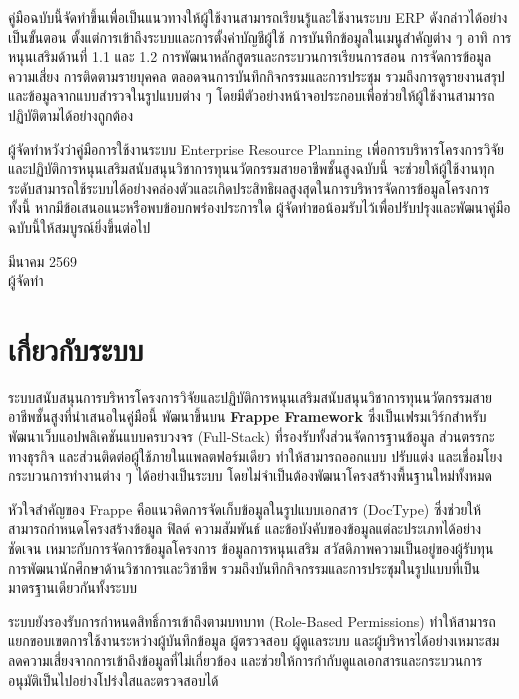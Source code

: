 \documentclass[17pt,a4paper]{extarticle}
\begin{document}
คู่มือฉบับนี้จัดทำขึ้นเพื่อเป็นแนวทางให้ผู้ใช้งานสามารถเรียนรู้และใช้งานระบบ ERP ดังกล่าวได้อย่างเป็นขั้นตอน ตั้งแต่การเข้าถึงระบบและการตั้งค่าบัญชีผู้ใช้ การบันทึกข้อมูลในเมนูสำคัญต่าง ๆ อาทิ การหนุนเสริมด้านที่ 1.1 และ 1.2 การพัฒนาหลักสูตรและกระบวนการเรียนการสอน การจัดการข้อมูลความเสี่ยง การติดตามรายบุคคล ตลอดจนการบันทึกกิจกรรมและการประชุม รวมถึงการดูรายงานสรุปและข้อมูลจากแบบสำรวจในรูปแบบต่าง ๆ โดยมีตัวอย่างหน้าจอประกอบเพื่อช่วยให้ผู้ใช้งานสามารถปฏิบัติตามได้อย่างถูกต้อง

ผู้จัดทำหวังว่าคู่มือการใช้งานระบบ Enterprise Resource Planning เพื่อการบริหารโครงการวิจัยและปฏิบัติการหนุนเสริมสนับสนุนวิชาการทุนนวัตกรรมสายอาชีพชั้นสูงฉบับนี้ จะช่วยให้ผู้ใช้งานทุกระดับสามารถใช้ระบบได้อย่างคล่องตัวและเกิดประสิทธิผลสูงสุดในการบริหารจัดการข้อมูลโครงการ ทั้งนี้ หากมีข้อเสนอแนะหรือพบข้อบกพร่องประการใด ผู้จัดทำขอน้อมรับไว้เพื่อปรับปรุงและพัฒนาคู่มือฉบับนี้ให้สมบูรณ์ยิ่งขึ้นต่อไป

\begin{flushright}
  มีนาคม 2569\\
  ผู้จัดทำ
\end{flushright}
\newpage
\section{เกี่ยวกับระบบ}

ระบบสนับสนุนการบริหารโครงการวิจัยและปฏิบัติการหนุนเสริมสนับสนุนวิชาการทุนนวัตกรรมสายอาชีพชั้นสูงที่นำเสนอในคู่มือนี้ พัฒนาขึ้นบน \textbf{Frappe Framework} ซึ่งเป็นเฟรมเวิร์กสำหรับพัฒนาเว็บแอปพลิเคชันแบบครบวงจร (Full-Stack) ที่รองรับทั้งส่วนจัดการฐานข้อมูล ส่วนตรรกะทางธุรกิจ และส่วนติดต่อผู้ใช้ภายในแพลตฟอร์มเดียว ทำให้สามารถออกแบบ ปรับแต่ง และเชื่อมโยงกระบวนการทำงานต่าง ๆ ได้อย่างเป็นระบบ โดยไม่จำเป็นต้องพัฒนาโครงสร้างพื้นฐานใหม่ทั้งหมด

หัวใจสำคัญของ Frappe คือแนวคิดการจัดเก็บข้อมูลในรูปแบบเอกสาร (DocType) ซึ่งช่วยให้สามารถกำหนดโครงสร้างข้อมูล ฟิลด์ ความสัมพันธ์ และข้อบังคับของข้อมูลแต่ละประเภทได้อย่างชัดเจน เหมาะกับการจัดการข้อมูลโครงการ ข้อมูลการหนุนเสริม สวัสดิภาพความเป็นอยู่ของผู้รับทุน การพัฒนานักศึกษาด้านวิชาการและวิชาชีพ รวมถึงบันทึกกิจกรรมและการประชุมในรูปแบบที่เป็นมาตรฐานเดียวกันทั้งระบบ

ระบบยังรองรับการกำหนดสิทธิ์การเข้าถึงตามบทบาท (Role-Based Permissions) ทำให้สามารถแยกขอบเขตการใช้งานระหว่างผู้บันทึกข้อมูล ผู้ตรวจสอบ ผู้ดูแลระบบ และผู้บริหารได้อย่างเหมาะสม ลดความเสี่ยงจากการเข้าถึงข้อมูลที่ไม่เกี่ยวข้อง และช่วยให้การกำกับดูแลเอกสารและกระบวนการอนุมัติเป็นไปอย่างโปร่งใสและตรวจสอบได้
\end{document}
